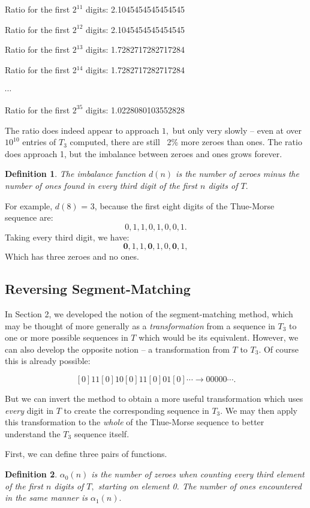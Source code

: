 \documentclass{article}
\newtheorem{definition}{Definition}[section]
\begin{document}
Ratio for the first $2^{11}$ digits: 2.1045454545454545

Ratio for the first $2^{12}$ digits: 2.1045454545454545

Ratio for the first $2^{13}$ digits: 1.7282717282717284

Ratio for the first 2$^{14}$ digits: 1.7282717282717284

$\cdots$

Ratio for the first $2^{35}$ digits: 1.0228080103552828

The ratio does indeed appear to approach $1,$ but only very slowly -- even at over $10^{10}$ entries of $T_3$ computed, there are still ~2\% more zeroes than ones. The ratio does approach 1, but the imbalance between zeroes and ones grows forever.

\begin{definition}
\label{imb}
The imbalance function $d(n)$ is the number of zeroes minus the number of ones found in every third digit of the first $n$ digits of $T.$
\end{definition}

For example, $d(8)$ = 3, because the first eight digits of the Thue-Morse sequence are:
$$0, 1, 1, 0, 1, 0, 0, 1.$$
Taking every third digit, we have:
$$\textbf{0}, 1, 1, \textbf{0}, 1, 0, \textbf{0}, 1,$$
Which has three zeroes and no ones.

\subsection{Reversing Segment-Matching}

In Section 2, we developed the notion of the segment-matching method, which may be thought of more generally as a \emph{transformation} from a sequence in $T_3$ to one or more possible sequences in $T$ which would be its equivalent. However, we can also develop the opposite notion -- a transformation from $T$ to $T_3.$ Of course this is already possible:

$$[0]11[0]10[0]11[0]01[0] \cdots \rightarrow 00000 \cdots .$$

But we can invert the method to obtain a more useful transformation which uses \emph{every} digit in $T$ to create the corresponding sequence in $T_3.$ We may then apply this transformation to the \emph{whole} of the Thue-Morse sequence to better understand the $T_3$ sequence itself.

First, we can define three pairs of functions.

\begin{definition}
$\alpha_0(n)$ is the number of zeroes when counting every third element of the first $n$ digits of $T,$ starting on element 0. The number of ones encountered in the same manner is $\alpha_1(n).$
\end{definition}
\end{document}
